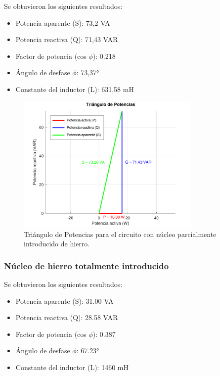 \documentclass{article}
\begin{document}
                        Se obtuvieron los siguientes resultados:
                        \begin{itemize}
                            \item Potencia aparente (S): 73,2 VA
                            \item Potencia reactiva (Q): 71,43 VAR
                            \item Factor de potencia (cos $\phi$): 0.218
                            \item Ángulo de desfase $\phi$: 73,37°
                            \item Constante del inductor (L): 631,58 mH
                        \end{itemize}

                        \begin{figure}[H]
                            \centering
                            \includegraphics[width=0.8\textwidth]{graficoParcialHierro.png}
                            \caption{Triángulo de Potencias para el circuito con núcleo parcialmente introducido de hierro.}
                            \label{fig:graficoParcialHierro}
                        \end{figure}


                    \subsubsection{Núcleo de hierro totalmente introducido}

                        Se obtuvieron los siguientes resultados:
                        \begin{itemize}
                            \item Potencia aparente (S): 31.00 VA
                            \item Potencia reactiva (Q): 28.58 VAR
                            \item Factor de potencia (cos $\phi$): 0.387
                            \item Ángulo de desfase $\phi$: 67.23°
                            \item Constante del inductor (L): 1460 mH
                        \end{itemize}
\end{document}

